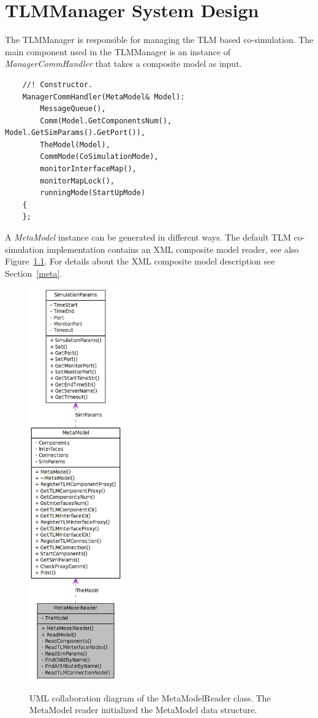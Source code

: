 \chapter{TLMManager System Design}
The TLMManager is responsible for managing the TLM based co-simulation. 
The main component used in the TLMManager is an instance of {\em ManagerCommHandler} that takes a composite model as input.
{\scriptsize
\begin{verbatim}
    //! Constructor.
    ManagerCommHandler(MetaModel& Model):
        MessageQueue(),
        Comm(Model.GetComponentsNum(), Model.GetSimParams().GetPort()),
        TheModel(Model),
        CommMode(CoSimulationMode),
        monitorInterfaceMap(),
        monitorMapLock(),
        runningMode(StartUpMode)
    {
    };
\end{verbatim}
}

A {\em MetaModel} instance can be generated in different ways. 
The default TLM co-simulation implementation contains an XML composite model reader, see also Figure~\ref{fig:MetaModelReader}. 
For details about the XML composite model description see Section~\ref{meta}.

\begin{figure}[ht]
\begin{center}
  {\includegraphics[width=4cm]{figs/classMetaModelReader__coll__graph.png}}
\end{center}
\caption{UML collaboration diagram of the MetaModelReader class. The
  MetaModel reader initialized the MetaModel data structure.}
\label{fig:MetaModelReader}
\end{figure}

